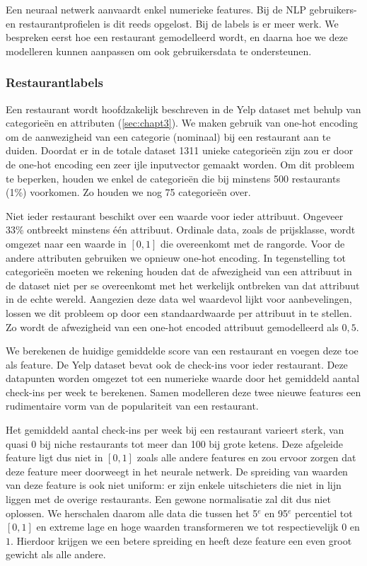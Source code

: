 Een neuraal netwerk aanvaardt enkel numerieke features. Bij de NLP gebruikers- en restaurantprofielen is dit reeds opgelost. Bij de labels is er meer werk. We bespreken eerst hoe een restaurant gemodelleerd wordt, en daarna hoe we deze modelleren kunnen aanpassen om ook gebruikersdata te ondersteunen.
\subsubsection{Restaurantlabels}
\label{sec:chapt4_nn_restaurantlabels}
Een restaurant wordt hoofdzakelijk beschreven in de Yelp dataset met behulp van categorieën en attributen (\autoref{sec:chapt3}). We maken gebruik van one-hot encoding om de aanwezigheid van een categorie (nominaal) bij een restaurant aan te duiden. Doordat er in de totale dataset 1311 unieke categorieën zijn zou er door de one-hot encoding een zeer ijle inputvector gemaakt worden. Om dit probleem te beperken, houden we enkel de categorieën die bij minstens 500 restaurants (1\%) voorkomen. Zo houden we nog 75 categorieën over.

Niet ieder restaurant beschikt over een waarde voor ieder attribuut. Ongeveer 33\% ontbreekt minstens één attribuut. Ordinale data, zoals de prijsklasse, wordt omgezet naar een waarde in $[0, 1]$ die overeenkomt met de rangorde. Voor de andere attributen gebruiken we opnieuw one-hot encoding. In tegenstelling tot categorieën moeten we rekening houden dat de afwezigheid van een attribuut in de dataset niet per se overeenkomt met het werkelijk ontbreken van dat attribuut in de echte wereld. Aangezien deze data wel waardevol lijkt voor aanbevelingen, lossen we dit probleem op door een standaardwaarde per attribuut in te stellen. Zo wordt de afwezigheid van een one-hot encoded attribuut gemodelleerd als $0,5$.

We berekenen de huidige gemiddelde score van een restaurant en voegen deze toe als feature. De Yelp dataset bevat ook de check-ins voor ieder restaurant. Deze datapunten worden omgezet tot een numerieke waarde door het gemiddeld aantal check-ins per week te berekenen. Samen modelleren deze twee nieuwe features een rudimentaire vorm van de populariteit van een restaurant.

Het gemiddeld aantal check-ins per week bij een restaurant varieert sterk, van quasi 0 bij niche restaurants tot meer dan 100 bij grote ketens. Deze afgeleide feature ligt dus niet in $[0, 1]$ zoals alle andere features en zou ervoor zorgen dat deze feature meer doorweegt in het neurale netwerk. De spreiding van waarden van deze feature is ook niet uniform: er zijn enkele uitschieters die niet in lijn liggen met de overige restaurants. Een gewone normalisatie zal dit dus niet oplossen. We herschalen daarom alle data die tussen het 5$^e$ en 95$^e$ percentiel tot $[0, 1]$ en extreme lage en hoge waarden transformeren we tot respectievelijk $0$ en $1$. Hierdoor krijgen we een betere spreiding en heeft deze feature een even groot gewicht als alle andere.


